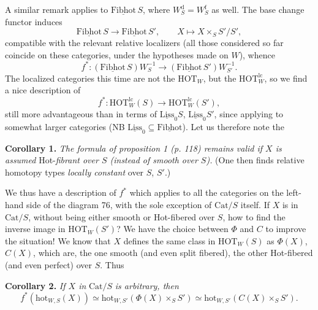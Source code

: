 \documentclass[11pt]{article}
\newcommand{\printedpage}[1]{\marginpar{\footnotesize p.~#1}}
\newcommand{\msp}[1]{\marginpar{\footnotesize [#1]}}
\newcommand{\und}[1]{\underline{\mathrm{#1}}}
\newcommand{\HOT}{\mathrm{HOT}}
\newcommand{\hot}{\mathrm{hot}}
\newcommand{\Cat}{\mathrm{Cat}}
\begin{document}
\printedpage{74}

\msp{page 119}
A similar remark applies to $\und{Fibhot}\,S$, where $W_S^{\mathrm{d}} = W_S^{\mathrm{f}}$ as well. The base change functor induces
\[
\und{Fibhot}\,S \longrightarrow \und{Fibhot}\,S', \qquad X \longmapsto X \times_S S'/S',
\]
compatible with the relevant relative localizers (all those considered so far coincide on these categories, under the hypotheses made on $W$), whence
\[
f^* : (\und{Fibhot}\,S)W_S^{-1} \longrightarrow (\und{Fibhot}\,S')W_{S'}^{-1}.
\]
The localized categories this time are not the $\HOT_W$, but the $\HOT_W^{\mathrm{lc}}$, so we find a nice description of
\[
f^* : \HOT_W^{\mathrm{lc}}(S) \longrightarrow \HOT_W^{\mathrm{lc}}(S'),
\]
still more advantageous than in terms of $\und{Liss}_0S$, $\und{Liss}_0S'$, since applying to somewhat larger categories (NB $\und{Liss}_0 \subseteq \und{Fibhot}$). Let us therefore note the

\textbf{Corollary 1.} \textit{The formula of proposition 1 (p. 118) remains valid if $X$ is assumed} Hot-\textit{fibrant over $S$ (instead of smooth over $S$).} (One then finds relative homotopy types \textit{locally constant} over $S$, $S'$.)

We thus have a description of $f^*$ which applies to all the categories on the left-hand side
\msp{page 120}
of the diagram 76, with the sole exception of $\Cat/S$ itself. If $X$ is in $\Cat/S$, without being either smooth or Hot-fibered over $S$, how to find the inverse image in $\HOT_W(S')$? We have the choice between $\Phi$ and $C$ to improve the situation! We know that $X$ defines the same class in $\HOT_W(S)$ as $\Phi(X)$, $C(X)$, which are, the one smooth (and even split fibered), the other Hot-fibered (and even perfect) over $S$. Thus

\textbf{Corollary 2.} \textit{If $X$ in} $\Cat/S$ \textit{is arbitrary, then}
\[
f^*(\hot_{W,S}(X)) \simeq \hot_{W,S'}(\Phi(X) \times_S S') \simeq \hot_{W,S'}(C(X) \times_S S').
\]

\bigskip
\end{document}
